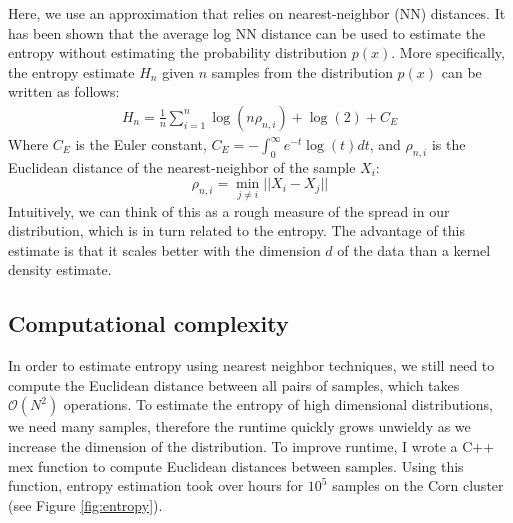 \documentclass[10pt,twocolumn,letterpaper]{article}
\begin{document}
Here, we use an approximation that relies on nearest-neighbor (NN) distances. It has been shown \cite{entropyest} that the average log NN distance can be used to estimate the entropy without estimating the probability distribution $p(x)$. More specifically, the entropy estimate $H_n$ given $n$ samples from the distribution $p(x)$ can be written as follows:
\begin{eqnarray}
    H_n = \frac{1}{n}\sum_{i=1}^n \log(n\rho_{n,i}) + \log(2) + C_E
\end{eqnarray}
Where $C_E$ is the Euler constant, $C_E = -\int_0^\infty e^{-t} \log(t) dt$, and $\rho_{n,i}$ is the Euclidean distance of the nearest-neighbor of the sample $X_i$:
$$ \rho_{n,i} = \min_{j\neq i} ||X_i - X_j||$$
\noindent Intuitively, we can think of this as a rough measure of the spread in our distribution, which is in turn related to the entropy.
The advantage of this estimate is that it scales better with the dimension $d$ of the data than a kernel density estimate.

\subsection{Computational complexity}
In order to estimate entropy using nearest neighbor techniques, we still need to compute the Euclidean distance between all pairs of samples, which takes $\mathcal{O}(N^2)$ operations. To estimate the entropy of high dimensional distributions, we need many samples, therefore the runtime quickly grows unwieldy as we increase the dimension of the distribution. To improve runtime, I wrote a C++ mex function to compute Euclidean distances between samples. Using this function, entropy estimation took over hours for $10^5$ samples on the Corn cluster (see Figure \ref{fig:entropy}).



\end{document}
